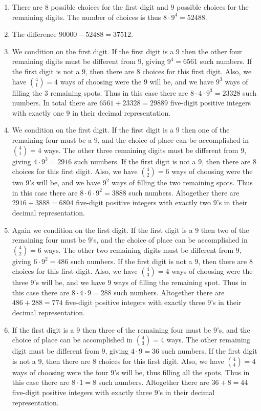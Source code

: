 \documentclass[11pt, openany]{book}
\theoremstyle{change} \theoremheaderfont{\blue\sffamily\bfseries}
\theoremstyle{nonumberplain} \theoremheaderfont{\sffamily\bfseries}
\def\binom#1#2{{#1\choose#2}}
\newcommand{\í}{\'{\i}}
\begin{document}
\begin{multicols}{2}
\begin{enumerate}
  \item There are $8$ possible choices for the first digit and $9$
possible choices for the remaining digits. The number of choices is
thus $8\cdot 9^4 = 52488$.
  \item The difference $90000 - 52488 = 37512.$
 \item We condition on the first digit. If the first digit is a $9$
then the other four remaining digits must be different from $9$,
giving $9^4 = 6561$ such numbers. If the first digit is not a $9$,
then there are $8$ choices for this first digit. Also, we have
$\binom{4}{1} = 4$ ways of choosing were the $9$ will be, and we
have $9^3$ ways of filling the $3$ remaining spots. Thus in this
case there are $8\cdot 4 \cdot 9^3 =  23328$ such numbers. In total
there are $6561+23328 = 29889$ five-digit positive integers with
exactly one $9$ in their decimal representation.
  \item  We condition on the first digit. If the first digit is a $9$
then one of the remaining four must be a $9$, and the choice of
place can be accomplished in $\binom{4}{1} = 4$ ways. The other
three remaining digits must be different from $9$, giving $4\cdot
9^3 = 2916$ such numbers. If the first digit is not a $9$, then
there are $8$ choices for this first digit. Also, we have
$\binom{4}{2} = 6$ ways of choosing were the two $9$'s will be, and
we have $9^2$ ways of filling the two remaining spots. Thus in this
case there are $8\cdot 6 \cdot 9^2 = 3888$ such numbers. Altogether
there are $2916 + 3888 = 6804$ five-digit positive integers with
exactly two $9$'s in their decimal representation.
\item  Again we condition on the first digit. If the first digit
is a $9$ then two of the remaining four must be $9$'s, and the
choice of place can be accomplished in $\binom{4}{2} = 6$ ways. The
other two remaining digits must be different from $9$, giving
$6\cdot 9^2 = 486$ such numbers. If the first digit is not a $9$,
then there are $8$ choices for this first digit. Also, we have
$\binom{4}{3} = 4$ ways of choosing were the three $9$'s will be,
and we have $9$ ways of filling the remaining spot. Thus in this
case there are $8\cdot 4 \cdot 9 = 288$ such numbers. Altogether
there are $486 + 288 = 774$ five-digit positive integers with
exactly three $9$'s in their decimal representation.
 \item  If the first digit is a $9$ then three of the remaining four
must be $9$'s, and the choice of place can be accomplished in
$\binom{4}{3} = 4$ ways. The other  remaining digit must be
different from $9$, giving $4\cdot 9 =  36$ such numbers. If the
first digit is not a $9$, then there are $8$ choices for this first
digit. Also, we have $\binom{4}{4} = 4$ ways of choosing were the
four $9$'s will be, thus filling all the spots. Thus in this case
there are $8\cdot 1 = 8$ such numbers. Altogether there are $36 + 8
= 44$ five-digit positive integers with exactly three $9$'s in their
decimal representation.


\end{enumerate}
\end{multicols}
\end{document}
